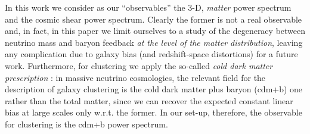 \documentclass[a4paper,11pt]{article}
\begin{document}
In this work we consider as our ``observables'' the 3-D, {\em matter} power spectrum and the cosmic shear power spectrum. Clearly the former is not a real observable and, in fact, in this paper we limit ourselves to a study of the degeneracy between neutrino mass and baryon feedback {\em at the level of the matter distribution}, leaving any complication due to galaxy bias (and redshift-space distortions) for a future work.
Furthermore, for clustering we apply the so-called \textit{cold dark matter prescription} \cite{Ichiki+11,nuLCDM1+13,nuLCDM2+13,nuLCDM3+13}: in massive neutrino cosmologies, the relevant field for the description of galaxy clustering is the cold dark matter plus baryon (cdm+b) one rather than the total matter, since we can recover the expected constant linear bias at large scales only w.r.t. the former. In our set-up, therefore, the observable for clustering is the cdm+b power spectrum.
\end{document}
